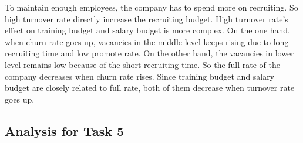 \documentclass[12pt,a4paper,titlepage]{article}
\begin{document}
To maintain enough employees, the company has to spend more on
recruiting. So high turnover rate directly increase the recruiting
budget. High turnover rate's effect on training budget and salary
budget is more complex. On the one hand, when churn rate goes up,
vacancies in the middle level keeps rising due to long recruiting time
and low promote rate. On the other hand, the vacancies in lower level
remains low because of the short recruiting time. So the full rate of
the company decreases when churn rate rises. Since training budget and
salary budget are closely related to full rate, both of them decrease
when turnover rate goes up.

\subsection{Analysis for Task 5}
\label{sec:analysis-for-task-5}
\end{document}
